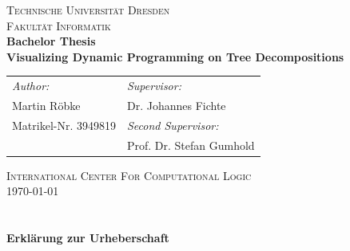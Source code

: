 \documentclass[a4paper, 12pt, bibliography=totoc]{scrartcl}
\begin{document}
\def\myauthor{Martin Röbke} 
\def\mycoauthor{Dr. Johannes Fichte} 
\def\mytitle{Visualizing Dynamic Programming on Tree Decompositions} 
\def\mydate{\today} 
\def\mymatriculation{3949819}
\def\mybirthday{04.03.1995}
\def\myemail{Martin.Roebke@tu-dresden.de}

\begin{titlepage}
	\begin{center}
		\textsc{\large 
		{Technische Universität Dresden \\
			Fakultät Informatik} \\
		[8ex]}             
		{\Large\bfseries Bachelor Thesis}           \\[12ex]
		
		{\huge\bfseries \mytitle}                  \\[6.5ex]
		
		\vspace{12ex}
			
		
		{\Large 
			\begin{tabular}{p{}l}
			
				\textit{Author:}&  \textit{Supervisor:}\\
				
				\myauthor &  Dr. Johannes Fichte\\
				
			{\normalsize Matrikel-Nr. 3949819}& \textit{Second Supervisor:}\\
				&  Prof. Dr. Stefan Gumhold\\[20ex]
				
			\end{tabular}
		}
		
		\vfill
		\textsc{International Center For Computational Logic 		\\[4ex]}
		\mydate
	\end{center}
\end{titlepage}
\newpage
\section*{ }
\thispagestyle{empty}
{\huge\bfseries{Erklärung zur Urheberschaft}\vspace{20pt}}
\end{document}
